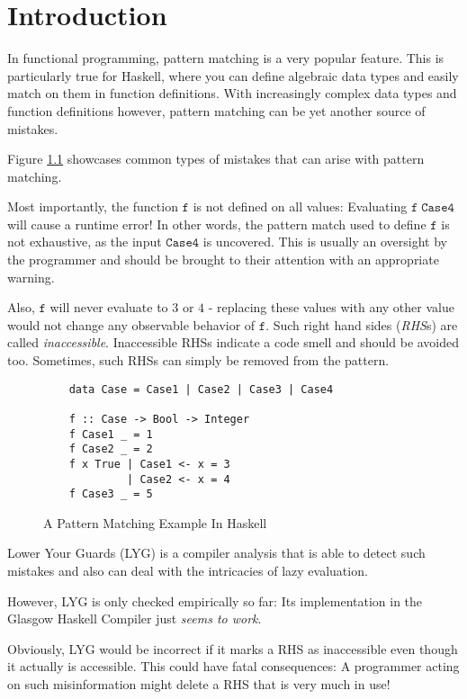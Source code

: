 \chapter{Introduction}\label{sec:intro}

In functional programming, pattern matching is a very popular feature.
This is particularly true for Haskell, where you can define algebraic data types
and easily match on them in function definitions.
With increasingly complex data types and function definitions however,
pattern matching can be yet another source of mistakes.

Figure \ref{lst:haskell} showcases common types of mistakes that can arise with pattern matching.

Most importantly, the function $\mathtt{f}$ is not defined on all values:
Evaluating $\mathtt{f}\;\mathtt{Case4}$ will cause a runtime error!
In other words, the pattern match used to define $\mathtt{f}$ is not exhaustive,
as the input $\mathtt{Case4}$ is uncovered.
This is usually an oversight by the programmer and should be brought to their attention with an appropriate warning.

Also, $\mathtt{f}$ will never evaluate to $3$ or $4$ - replacing these values with any other value would not change any observable behavior of $\mathtt{f}$. Such right hand sides (\textit{RHS}s) are called \textit{inaccessible}.
Inaccessible RHSs indicate a code smell and should be avoided too. Sometimes, such RHSs can simply be removed from the pattern.

\begin{figure}[htbp]
	\caption{A Pattern Matching Example In Haskell}
	\label{lst:haskell}
    \begin{verbatim}
    data Case = Case1 | Case2 | Case3 | Case4
    
    f :: Case -> Bool -> Integer
    f Case1 _ = 1
    f Case2 _ = 2
    f x True | Case1 <- x = 3
             | Case2 <- x = 4
    f Case3 _ = 5
    \end{verbatim}
\end{figure}


Lower Your Guards (LYG) \cite{10.1145/3408989} is a compiler analysis that is able to detect such mistakes and also can deal with the intricacies of lazy evaluation.

However, LYG is only checked empirically so far: Its implementation in the Glasgow Haskell Compiler just \textit{seems to work}.

Obviously, LYG would be incorrect if it marks a RHS as inaccessible even though it actually
is accessible. This could have fatal consequences: A programmer acting on such misinformation
might delete a RHS that is very much in use!

